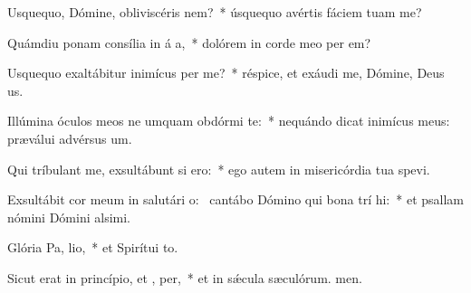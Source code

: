 \item Usquequo, Dómine, obliviscéris   nem?~* úsquequo avértis fáciem tuam  me?
\item Quámdiu ponam consília in á a,~* dolórem in corde meo per em?
\item Usquequo exaltábitur inimícus  per me?~* réspice, et exáudi me, Dómine, Deus us.
\item Illúmina óculos meos ne umquam obdórmi  te:~* nequándo dicat inimícus meus: præválui advérsus um.
\item Qui tríbulant me, exsultábunt si  ero:~* ego autem in misericórdia tua spevi.
\item Exsultábit cor meum in salutári o:~\pscross{} cantábo Dómino qui bona trí hi:~* et psallam nómini Dómini alsimi.
\item Glória Pa,  lio,~* et Spirítui to.
\item Sicut erat in princípio, et ,  per,~* et in sǽcula sæculórum. men.
